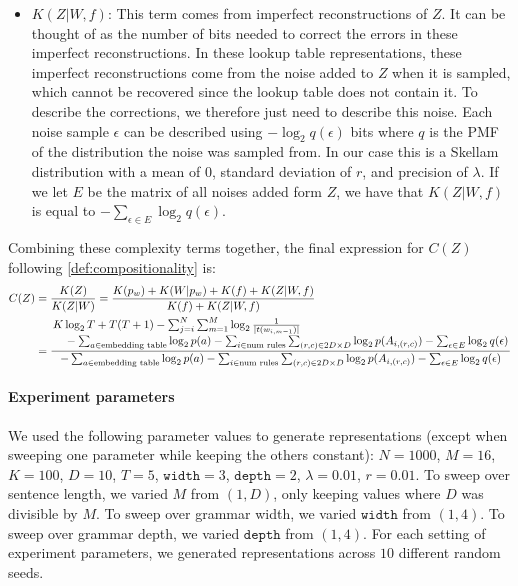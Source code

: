 \documentclass{article} %
\begin{document}
\begin{appendices}
\begin{itemize}
    \item $K(Z|W,f)$: This term comes from imperfect reconstructions of $Z$. It can be thought of as the number of bits needed to correct the errors in these imperfect reconstructions. In these lookup table representations, these imperfect reconstructions come from the noise added to $Z$ when it is sampled, which cannot be recovered since the lookup table does not contain it. To describe the corrections, we therefore just need to describe this noise. Each noise sample $\epsilon$ can be described using $-\log_2 q(\epsilon)$ bits where $q$ is the PMF of the distribution the noise was sampled from. In our case this is a Skellam distribution with a mean of 0, standard deviation of $r$, and precision of $\lambda$. If we let $E$ be the matrix of all noises added form $Z$, we have that $K(Z|W,f)$ is equal to $-\sum_{\epsilon \in E} \log_2 q(\epsilon)$.
\end{itemize}

Combining these complexity terms together, the final expression for $C(Z)$ following \cref{def:compositionality} is:
\begin{align*}
    C(Z) &= \frac{K(Z)}{K(Z|W)} = \frac{K(p_w) + K(W|p_w) + K(f) + K(Z|W,f)}{K(f) + K(Z|W,f)} \\
    &=
    \frac{\splitfrac{K\log_2 T + T(T+1) - \sum_{j=i}^N \sum_{m=1}^M \log_2 \frac{1}{|t(w_{i,m-1})|}} {- \sum_{a \in \text{embedding table}} \log_2 p(a) - \sum_{i \in \text{num rules}} \sum_{(r, c) \in 2D \times D} \log_2 p(A_{i, (r,c)}) - \sum_{\epsilon \in E} \log_2 q(\epsilon)}}{- \sum_{a \in \text{embedding table}} \log_2 p(a) - \sum_{i \in \text{num rules}} \sum_{(r, c) \in 2D \times D} \log_2 p(A_{i, (r,c)}) - \sum_{\epsilon \in E} \log_2 q(\epsilon)}
\end{align*}

\paragraph{Experiment parameters}

We used the following parameter values to generate representations (except when sweeping one parameter while keeping the others constant): $N=1000$, $M=16$, $K=100$, $D=10$, $T=5$, $\texttt{width}=3$, $\texttt{depth}=2$, $\lambda=0.01$, $r=0.01$. To sweep over sentence length, we varied $M$ from $(1, D)$, only keeping values where $D$ was divisible by $M$. To sweep over grammar width, we varied $\texttt{width}$ from $(1, 4)$. To sweep over grammar depth, we varied $\texttt{depth}$ from $(1, 4)$. For each setting of experiment parameters, we generated representations across $10$ different random seeds.



\end{appendices}
\end{document}
